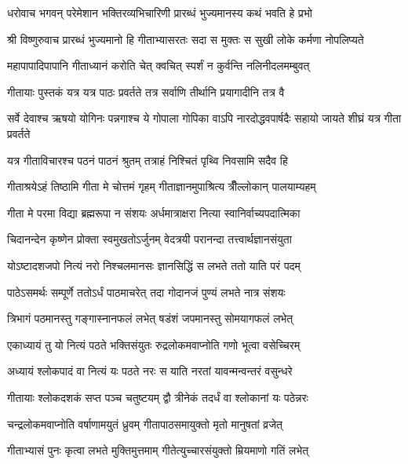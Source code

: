 {धरोवाच}
\twolineshloka
{भगवन् परेमेशान भक्तिरव्यभिचारिणी}
{प्रारब्धं भुज्यमानस्य कथं भवति हे प्रभो}%

{श्री विष्णुरुवाच}
\twolineshloka
{प्रारब्धं भुज्यमानो हि गीताभ्यासरतः सदा}
{स मुक्तः स सुखी लोके कर्मणा नोपलिप्यते}%

\twolineshloka
{महापापादिपापानि गीताध्यानं करोति चेत्}
{क्वचित् स्पर्शं न कुर्वन्ति नलिनीदलमम्बुवत्}%

\twolineshloka
{गीतायाः पुस्तकं यत्र यत्र पाठः प्रवर्तते}
{तत्र सर्वाणि तीर्थानि प्रयागादीनि तत्र वै}%

\threelineshloka
{सर्वे देवाश्च ऋषयो योगिनः पन्नगाश्च ये}
{गोपाला गोपिका वाऽपि नारदोद्धवपार्षदैः}
{सहायो जायते शीघ्रं यत्र गीता प्रवर्तते}%

\twolineshloka
{यत्र गीताविचारश्च पठनं पाठनं श्रुतम्}
{तत्राहं निश्चितं पृथ्वि निवसामि सदैव हि}%

\twolineshloka
{गीताश्रयेऽहं तिष्ठामि गीता मे चोत्तमं गृहम्}
{गीताज्ञानमुपाश्रित्य त्रीँल्लोकान् पालयाम्यहम्}%

\twolineshloka
{गीता मे परमा विद्या ब्रह्मरूपा न संशयः}
{अर्धमात्राक्षरा नित्या स्वानिर्वाच्यपदात्मिका}%

\twolineshloka
{चिदानन्देन कृष्णेन प्रोक्ता स्वमुखतोऽर्जुनम्}
{वेदत्रयी परानन्दा तत्त्वार्थज्ञानसंयुता}%

\twolineshloka
{योऽष्टादशजपो नित्यं नरो निश्चलमानसः}
{ज्ञानसिद्धिं स लभते ततो याति परं पदम्}%

\twolineshloka
{पाठेऽसमर्थः सम्पूर्णे ततोऽर्धं पाठमाचरेत्}
{तदा गोदानजं पुण्यं लभते नात्र संशयः}%

\twolineshloka
{त्रिभागं पठमानस्तु गङ्गास्नानफलं लभेत्}
{षडंशं जपमानस्तु सोमयागफलं लभेत्}%

\twolineshloka
{एकाध्यायं तु यो नित्यं पठते भक्तिसंयुतः}
{रुद्रलोकमवाप्नोति गणो भूत्वा वसेच्चिरम्}%

\twolineshloka
{अध्यायं श्लोकपादं वा नित्यं यः पठते नरः}
{स याति नरतां यावन्मन्वन्तरं वसुन्धरे}%

\twolineshloka
{गीतायाः श्लोकदशकं सप्त पञ्च चतुष्टयम्}
{द्वौ त्रीनेकं तदर्धं वा श्लोकानां यः पठेन्नरः}%

\twolineshloka
{चन्द्रलोकमवाप्नोति वर्षाणामयुतं ध्रुवम्}
{गीतापाठसमायुक्तो मृतो मानुषतां व्रजेत्}%

\twolineshloka
{गीताभ्यासं पुनः कृत्वा लभते मुक्तिमुत्तमाम्}
{गीतेत्युच्चारसंयुक्तो म्रियमाणो गतिं लभेत्}%

